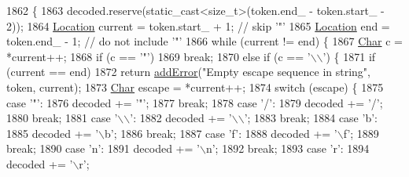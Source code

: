 \begin{DoxyCode}
1862                                                                   \{
1863   decoded.reserve(static\_cast<size\_t>(token.end\_ - token.start\_ - 2));
1864   \hyperlink{class_json_1_1_our_reader_a1bdc7bbc52ba87cae6b19746f2ee0189}{Location} current = token.start\_ + 1; \textcolor{comment}{// skip '"'}
1865   \hyperlink{class_json_1_1_our_reader_a1bdc7bbc52ba87cae6b19746f2ee0189}{Location} end = token.end\_ - 1;       \textcolor{comment}{// do not include '"'}
1866   \textcolor{keywordflow}{while} (current != end) \{
1867     \hyperlink{class_json_1_1_our_reader_a0cd0bab4caa66594ab843ccd5f9dc239}{Char} c = *current++;
1868     \textcolor{keywordflow}{if} (c == \textcolor{charliteral}{'"'})
1869       \textcolor{keywordflow}{break};
1870     \textcolor{keywordflow}{else} \textcolor{keywordflow}{if} (c == \textcolor{charliteral}{'\(\backslash\)\(\backslash\)'}) \{
1871       \textcolor{keywordflow}{if} (current == end)
1872         \textcolor{keywordflow}{return} \hyperlink{class_json_1_1_our_reader_aa6a920311e6408ff3a45324d49da18a6}{addError}(\textcolor{stringliteral}{"Empty escape sequence in string"}, token, current);
1873       \hyperlink{class_json_1_1_our_reader_a0cd0bab4caa66594ab843ccd5f9dc239}{Char} escape = *current++;
1874       \textcolor{keywordflow}{switch} (escape) \{
1875       \textcolor{keywordflow}{case} \textcolor{charliteral}{'"'}:
1876         decoded += \textcolor{charliteral}{'"'};
1877         \textcolor{keywordflow}{break};
1878       \textcolor{keywordflow}{case} \textcolor{charliteral}{'/'}:
1879         decoded += \textcolor{charliteral}{'/'};
1880         \textcolor{keywordflow}{break};
1881       \textcolor{keywordflow}{case} \textcolor{charliteral}{'\(\backslash\)\(\backslash\)'}:
1882         decoded += \textcolor{charliteral}{'\(\backslash\)\(\backslash\)'};
1883         \textcolor{keywordflow}{break};
1884       \textcolor{keywordflow}{case} \textcolor{charliteral}{'b'}:
1885         decoded += \textcolor{charliteral}{'\(\backslash\)b'};
1886         \textcolor{keywordflow}{break};
1887       \textcolor{keywordflow}{case} \textcolor{charliteral}{'f'}:
1888         decoded += \textcolor{charliteral}{'\(\backslash\)f'};
1889         \textcolor{keywordflow}{break};
1890       \textcolor{keywordflow}{case} \textcolor{charliteral}{'n'}:
1891         decoded += \textcolor{charliteral}{'\(\backslash\)n'};
1892         \textcolor{keywordflow}{break};
1893       \textcolor{keywordflow}{case} \textcolor{charliteral}{'r'}:
1894         decoded += \textcolor{charliteral}{'\(\backslash\)r'};

\end{DoxyCode}

